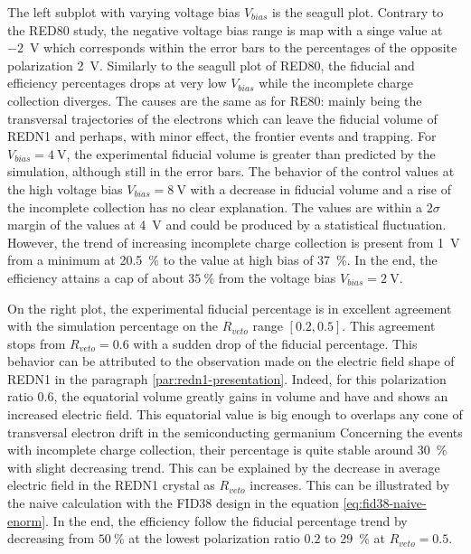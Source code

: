 The left subplot with varying voltage bias $V_{bias}$ is the seagull plot. Contrary to the RED80 study, the negative voltage bias range is map with a singe value at \SI{-2}{\volt} which corresponds within the error bars to the percentages of the opposite polarization \SI{2}{\volt}. Similarly to the seagull plot of RED80, the fiducial and efficiency percentages drops at very low $V_{bias}$ while the incomplete charge collection diverges. The causes are the same as for RE80: mainly being the transversal trajectories of the electrons which can leave the fiducial volume of REDN1 and perhaps, with minor effect, the frontier events and trapping.
For $V_{bias}=\SI{4}{\volt}$, the  experimental fiducial volume is greater than predicted by the simulation, although still in the error bars.
The behavior of the control values at the high voltage bias $V_{bias} = \SI{8}{\volt}$ with a decrease in fiducial volume and a rise of the incomplete collection has no clear explanation. The values are within a $2\sigma$ margin of the values at \SI{4}{\volt} and could be produced by a statistical fluctuation.
However, the trend of increasing incomplete charge collection is present from \SI{1}{\volt} from a minimum at \SI{20.5}{\percent} to the value at high bias of \SI{37}{\percent}.
In the end, the efficiency attains a cap of about $\SI{35}{\percent}$ from the voltage bias $V_{bias} = \SI{2}{\volt}$.

On the right plot, the experimental fiducial percentage is in excellent agreement with the simulation percentage on the $R_{veto}$ range $[0.2, 0.5]$. This agreement stops from $R_{veto} = 0.6$ with a sudden drop of the fiducial percentage. This behavior can be attributed to the observation made on the electric field shape of REDN1 in the paragraph \ref{par:redn1-presentation}. Indeed, for this polarization ratio $0.6$, the equatorial volume greatly gains in volume and have and shows an increased electric field. This equatorial value is big enough to overlaps any cone of transversal electron drift in the semiconducting germanium
 Concerning the events with incomplete charge collection, their percentage is quite stable around \SI{30}{\percent} with slight decreasing trend. This can be explained by the decrease in average electric field in the REDN1 crystal as $R_{veto}$ increases. This can be illustrated by the naive calculation with the FID38 design in the equation \ref{eq:fid38-naive-enorm}. 
In the end, the efficiency follow the fiducial percentage trend by decreasing from $\SI{50}{\percent}$ at the lowest polarization ratio $0.2$ to \SI{29}{\percent} at $R_{veto}=0.5$.

